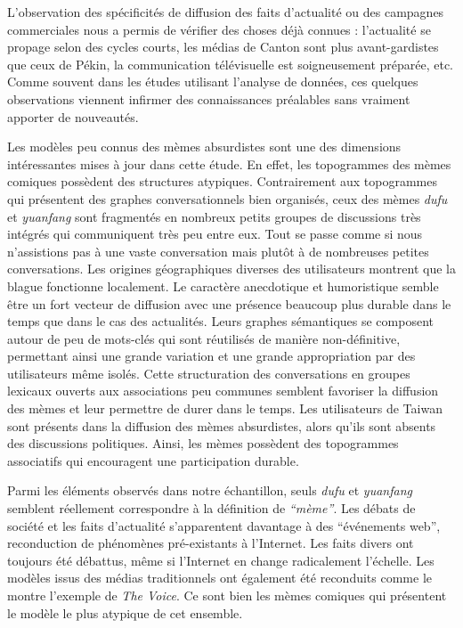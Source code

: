 L'observation des spécificités de diffusion des faits d'actualité ou des campagnes commerciales nous a permis de vérifier des choses déjà connues : l'actualité se propage selon des cycles courts, les médias de Canton sont plus avant-gardistes que ceux de Pékin, la communication télévisuelle est soigneusement préparée, etc. Comme souvent dans les études utilisant l'analyse de données, ces quelques observations viennent infirmer des connaissances préalables sans vraiment apporter de nouveautés. 

Les modèles peu connus des mèmes absurdistes sont une des dimensions intéressantes mises à jour dans cette étude. En effet, les topogrammes des mèmes comiques possèdent des structures atypiques. Contrairement aux topogrammes qui présentent des graphes conversationnels bien organisés, ceux des mèmes \textit{dufu} et \textit{yuanfang} sont fragmentés en nombreux petits groupes de discussions très intégrés qui communiquent très peu entre eux. Tout se passe comme si nous n'assistions pas à une vaste conversation mais plutôt à de nombreuses petites conversations. Les origines géographiques diverses des utilisateurs montrent que la blague fonctionne localement. Le caractère anecdotique et humoristique semble être un fort vecteur de diffusion avec une présence beaucoup plus durable dans le temps que dans le cas des actualités. Leurs graphes sémantiques se composent autour de peu de mots-clés qui sont réutilisés de manière non-définitive, permettant ainsi une grande variation et une grande appropriation par des utilisateurs même isolés. Cette structuration des conversations en groupes lexicaux ouverts aux associations peu communes semblent favoriser la diffusion des mèmes et leur permettre de durer dans le temps. Les utilisateurs de Taiwan sont présents dans la diffusion des mèmes absurdistes, alors qu'ils sont absents des discussions politiques. Ainsi, les mèmes possèdent des topogrammes associatifs qui encouragent une participation durable.

Parmi les éléments observés dans notre échantillon, seuls \textit{dufu} et \textit{yuanfang} semblent réellement correspondre à la définition de \textit{``mème''}. Les débats de société et les faits d'actualité s'apparentent davantage à des ``événements web'', reconduction de phénomènes pré-existants à l'Internet. Les faits divers ont toujours été débattus, même si l'Internet en change radicalement l'échelle. Les modèles issus des médias traditionnels ont également été reconduits comme le montre l'exemple de \textit{The Voice}. Ce sont bien les mèmes comiques qui présentent le modèle le plus atypique de cet ensemble.

